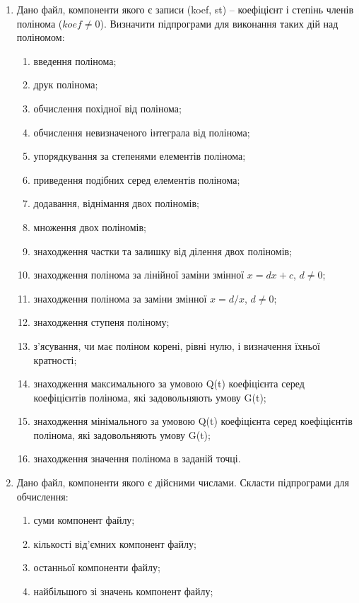 \documentclass[]{article}
\makeatletter
\newcommand{\xslalph}[1]{\expandafter\@xslalph\csname c@#1\endcsname}
\newcommand{\@xslalph}[1]{%
    \ifcase#1\or а\or б\or в\or г\or д\or e\or є\or ж\or з\or i%
    \or й\or к\or л\or м\or н\or о\or п\or р\or с\or т%
    \or у\or ф\or х\or ц\or ч\or ш\or ю\or я\or аа\or бб\or вв %
    \else\@ctrerr\fi%
}
\makeatother
\begin{document}
\begin{enumerate}
\item
Дано файл, компоненти якого є записи (koef, st) -- коефіцієнт і
степінь членів полінома ($koef \neq 0$). Визначити підпрограми для виконання
таких дій над поліномом:
\begin{enumerate}[label=\xslalph*)]
\item
 введення полінома;
\item
 друк полінома;
\item обчислення похідної від полінома;
\item обчислення невизначеного інтеграла від полінома;
\item упорядкування за степенями елементів полінома;
\item приведення подібних серед елементів полінома;
\item додавання, віднімання двох поліномів;
\item множення двох поліномів;
\item знаходження частки та залишку від ділення двох поліномів;
\item знаходження полінома за лінійної заміни змінної $x = dx + c$, $d \neq 0$;
\item знаходження полінома за заміни змінної $x = d/x$, $d \neq 0$;
\item знаходження ступеня поліному;
\item з'ясування, чи має поліном корені, рівні нулю, і визначення їхньої
кратності;
\item знаходження максимального за умовою Q(t) коефіцієнта серед
коефіцієнтів полінома, які задовольняють умову G(t);
\item знаходження мінімального за умовою Q(t) коефіцієнта серед
коефіцієнтів полінома, які задовольняють умову G(t);
\item знаходження значення полінома в заданій точці.
\end{enumerate}

\item
Дано файл, компоненти якого є
дійсними числами. Скласти підпрограми для обчислення:
\begin{enumerate}[label=\xslalph*)]
\item суми компонент файлу;

\item кількості від'ємних компонент файлу;

\item останньої компоненти файлу;

\item найбільшого зі значень компонент файлу;


\end{enumerate}
\end{enumerate}
\end{document}
